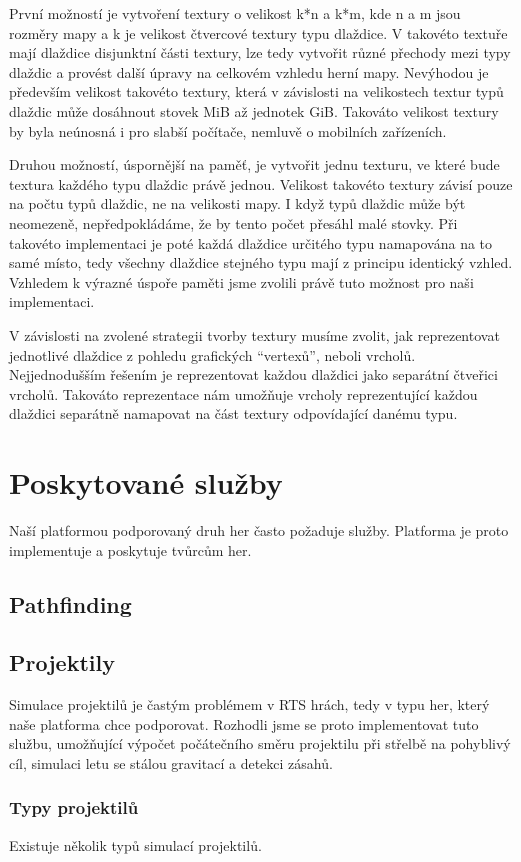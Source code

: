 První možností je vytvoření textury o velikost k*n a k*m, kde n a m jsou rozměry mapy a k je velikost čtvercové textury typu dlaždice. V takovéto textuře mají dlaždice disjunktní části textury, lze tedy vytvořit různé přechody mezi typy dlaždic a provést další úpravy na celkovém vzhledu herní mapy. Nevýhodou je především velikost takovéto textury, která v závislosti na velikostech textur typů dlaždic může dosáhnout stovek MiB až jednotek GiB. Takováto velikost textury by byla neúnosná i pro slabší počítače, nemluvě o mobilních zařízeních. 

Druhou možností, úspornější na paměť, je vytvořit jednu texturu, ve které bude textura každého typu dlaždic právě jednou. Velikost takovéto textury závisí pouze na počtu typů dlaždic, ne na velikosti mapy. I když typů dlaždic může být neomezeně, nepředpokládáme, že by tento počet přesáhl malé stovky. Při takovéto implementaci je poté každá dlaždice určitého typu namapována na to samé místo, tedy všechny dlaždice stejného typu mají z principu identický vzhled. Vzhledem k výrazné úspoře paměti jsme zvolili právě tuto možnost pro naši implementaci.

V závislosti na zvolené strategii tvorby textury musíme zvolit, jak reprezentovat jednotlivé dlaždice z pohledu grafických ``vertexů'', neboli vrcholů. Nejjednodušším řešením je reprezentovat každou dlaždici jako separátní čtveřici vrcholů. Takováto reprezentace nám umožňuje vrcholy reprezentující každou dlaždici separátně namapovat na část textury odpovídající danému typu. 


\section{Poskytované služby}
Naší platformou podporovaný druh her často požaduje služby. Platforma je proto implementuje a poskytuje tvůrcům her.

\subsection{Pathfinding}

\subsection{Projektily}
Simulace projektilů je častým problémem v RTS hrách, tedy v typu her, který naše platforma chce podporovat. Rozhodli jsme se proto implementovat tuto službu, umožňující výpočet počátečního směru projektilu při střelbě na pohyblivý cíl, simulaci letu se stálou gravitací a detekci zásahů.

\subsubsection{Typy projektilů}
Existuje několik typů simulací projektilů. \citep{site:projectilecalc}